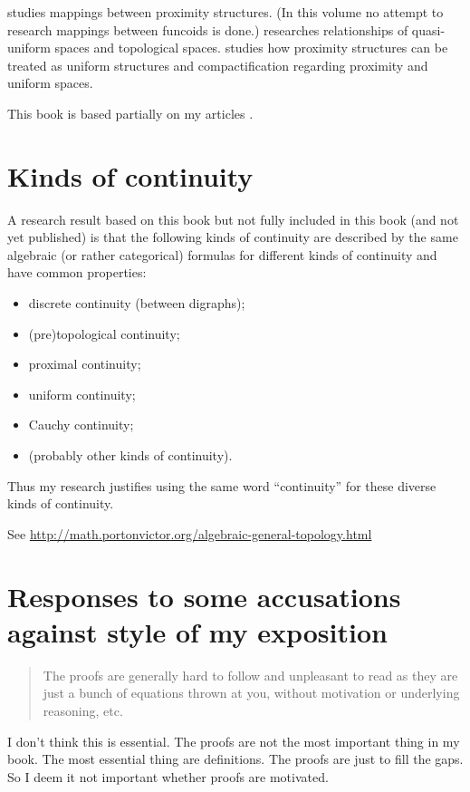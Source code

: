 \cite{mapping-prox} studies mappings between proximity structures.
(In this volume no attempt to research mappings between funcoids is
done.) \cite{quasi-unif-top} researches relationships of quasi-uniform
spaces and topological spaces. \cite{eq-prox-totbound-unif} studies
how proximity structures can be treated as uniform structures and
compactification regarding proximity and uniform spaces.

This book is based partially on my articles \cite{filters,funcoidsreloids,pointfree}.


\section{Kinds of continuity}

A research result based on this book but not fully included in this
book (and not yet published) is that the following kinds of continuity
are described by the same algebraic (or rather categorical) formulas
for different kinds of continuity and have common properties:
\begin{itemize}
\item discrete continuity (between digraphs);
\item (pre)topological continuity;
\item proximal continuity;
\item uniform continuity;
\item Cauchy continuity;
\item (probably other kinds of continuity).
\end{itemize}
Thus my research justifies using the same word ``continuity'' for
these diverse kinds of continuity.

See \url{http://math.portonvictor.org/algebraic-general-topology.html}

\section{Responses to some accusations against style of my exposition}

\begin{quote}
The proofs are generally hard to follow and unpleasant to read as they are just a bunch of equations thrown at you, without motivation or underlying reasoning, etc.
\end{quote}

I don't think this is essential. The proofs are not the most important thing in my book. The most essential thing are definitions. The proofs are just to fill the gaps. So I deem it not important whether proofs are motivated.


